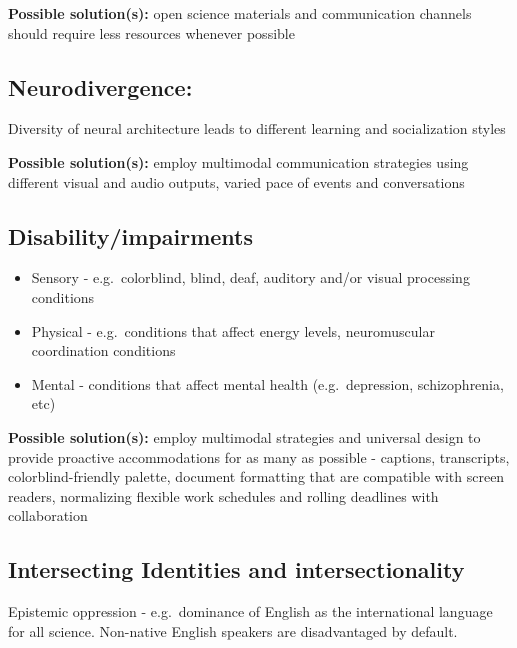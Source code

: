 \documentclass[
  letterpaper,
  DIV=11,
  numbers=noendperiod]{scrreport}
\providecommand{\tightlist}{%
  \setlength{\itemsep}{0pt}\setlength{\parskip}{0pt}}\usepackage{longtable,booktabs,array}
\begin{document}
\textbf{Possible solution(s):} open science materials and communication
channels should require less resources whenever possible

\hypertarget{neurodivergence}{%
\subsection{Neurodivergence:}\label{neurodivergence}}

Diversity of neural architecture leads to different learning and
socialization styles

\textbf{Possible solution(s):} employ multimodal communication
strategies using different visual and audio outputs, varied pace of
events and conversations

\hypertarget{disabilityimpairments}{%
\subsection{Disability/impairments}\label{disabilityimpairments}}

\begin{itemize}
\tightlist
\item
  Sensory - e.g.~colorblind, blind, deaf, auditory and/or visual
  processing conditions
\item
  Physical - e.g.~conditions that affect energy levels, neuromuscular
  coordination conditions
\item
  Mental - conditions that affect mental health (e.g.~depression,
  schizophrenia, etc)
\end{itemize}

\textbf{Possible solution(s):} employ multimodal strategies and
universal design to provide proactive accommodations for as many as
possible - captions, transcripts, colorblind-friendly palette, document
formatting that are compatible with screen readers, normalizing flexible
work schedules and rolling deadlines with collaboration

\hypertarget{intersecting-identities-and-intersectionality}{%
\subsection{Intersecting Identities and
intersectionality}\label{intersecting-identities-and-intersectionality}}

Epistemic oppression - e.g.~dominance of English as the international
language for all science. Non-native English speakers are disadvantaged
by default.
\end{document}
